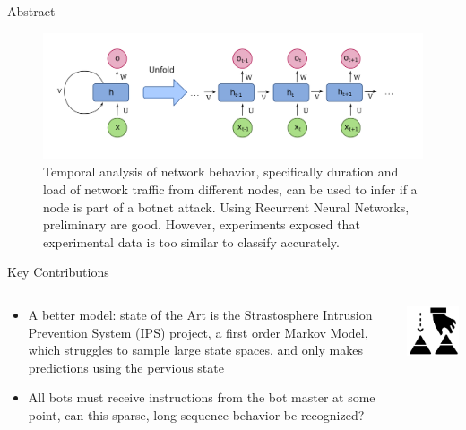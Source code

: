 \documentclass[pdf]{beamer}
\begin{document}
\begin{frame}[fragile]{Abstract}
\begin{figure}
\includegraphics[width=0.9\linewidth,keepaspectratio]{Images/rnn.png}
\caption{Temporal analysis of  network behavior, specifically duration and load of network traffic from different nodes, can be used to infer if a node is part of a botnet attack. Using Recurrent Neural Networks, preliminary are good.  However,  experiments  exposed that experimental data is too similar to classify accurately.}
\end{figure}
\end{frame}





\begin{frame}[fragile]{Key Contributions}
\begin{minipage}[0.2\textheight]{\textwidth}
\begin{columns}[T]
\begin{column}{0.5\textwidth}
\begin{itemize}
\item A better model: state of the Art is the Strastosphere Intrusion Prevention System (IPS) project, a first order Markov Model, which struggles to sample large state spaces, and only makes predictions using the pervious state
\item All bots must receive instructions from the bot master at some point, can this sparse, long-sequence behavior be recognized?
\end{itemize}
\end{column}
\begin{column}{0.5\textwidth}
\includegraphics[width=5cm]{Images/contribute.png}
\end{column}
\end{columns}
\end{minipage}
\end{frame}
\end{document}
